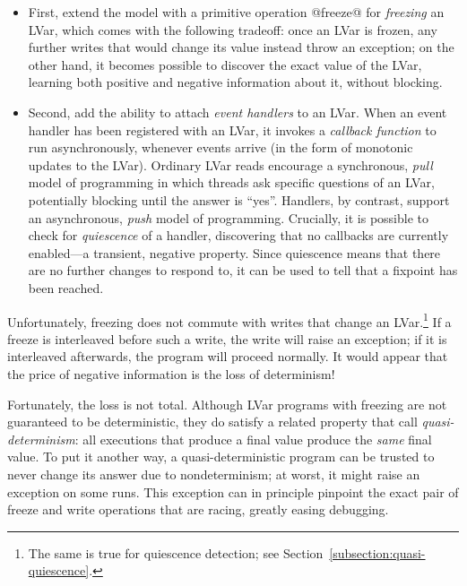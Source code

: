 \begin{itemize}
\item First,  extend the model with a primitive operation @freeze@
  for \emph{freezing} an LVar, which comes with the following
  tradeoff: once an LVar is frozen, any further writes that would
  change its value instead throw an exception; on the other hand, it
  becomes possible to discover the exact value of the LVar, learning
  both positive and negative information about it, without blocking.
\item
  Second,  add the ability to attach \emph{event handlers} to an
  LVar.  When an event handler has been registered with an LVar, it
  invokes a \emph{callback function} to run asynchronously, whenever
  events arrive (in the form of monotonic updates to the LVar).
  Ordinary LVar reads encourage a synchronous, \emph{pull} model of
  programming in which threads ask specific questions of an LVar,
  potentially blocking until the answer is ``yes''.  Handlers, by
  contrast, support an asynchronous, \emph{push} model of programming.
  Crucially, it is possible to check for \emph{quiescence} of a
  handler, discovering that no callbacks are currently enabled---a
  transient, negative property.  Since quiescence means that there are
  no further changes to respond to, it can be used to tell that a
  fixpoint has been reached.
\end{itemize}

\fi
Unfortunately, freezing does not commute with writes that change an
LVar.\footnote{The same is true for quiescence detection; see
Section~\ref{subsection:quasi-quiescence}.}  If a freeze is
interleaved before such a write, the write will raise an exception; if
it is interleaved afterwards, the program will proceed normally.  It
would appear that the price of negative information is the loss of
determinism!

Fortunately, the loss is not total.  Although LVar programs with
freezing are not guaranteed to be deterministic, they do satisfy a
related property that  call \emph{quasi-determinism}: all executions
that produce a final value produce the \emph{same} final value.  To
put it another way, a quasi-deterministic program can be trusted to
never change its answer due to nondeterminism; at worst, it might
raise an exception on some runs.  This exception can in principle
pinpoint the exact pair of freeze and write operations that are
racing, greatly easing debugging.

